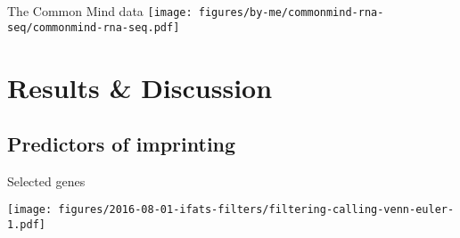\documentclass{beamer}
\begin{document}
\begin{frame}[label=cmc]{The Common Mind data}
\texttt{[image: figures/by-me/commonmind-rna-seq/commonmind-rna-seq.pdf]}
\end{frame}

\section{Results \& Discussion}
\subsection{Predictors of imprinting}

\begin{frame}{Selected genes}
\begin{center}
\texttt{[image: figures/2016-08-01-ifats-filters/filtering-calling-venn-euler-1.pdf]}
\end{center}
\end{frame}
\end{document}
